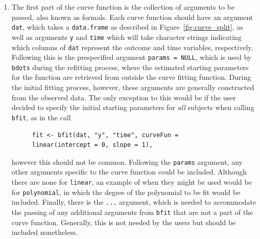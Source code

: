 \documentclass{article}
\newcommand{\xt}{\texttt}%
\begin{document}
\begin{enumerate}
\item The first part of the curve function is the collection of arguments to be passed, also known as formals. Each curve function should have an argument \xt{dat}, which takes a \xt{data.frame} as described in Figure~\ref{fig:curve_split}, as well as arguments \xt{y} and \xt{time} which will take character strings indicating which columns of \xt{dat} represent the outcome and time variables, respectively. Following this is the prespecified argument \xt{params = NULL}, which is used by \xt{bdots} during the refitting process, where the estimated starting parameters for the function are retrieved from outside the curve fitting function. During the initial fitting process, however, these arguments are generally constructed from the observed data. The only exception to this would be if the user decided to specify the initial starting parameters for \textit{all} subjects when calling \xt{bfit}, as in the call

\begin{singlespace}
\begin{figure}[H]
\centering
\begin{BVerbatim}
fit <- bfit(dat, "y", "time", curveFun = linear(intercept = 0, slope = 1),
\end{BVerbatim}
\end{figure}
\end{singlespace}
however this should not be common. Following the \xt{params} argument, any other arguments specific to the curve function could be included. Although there are none for \xt{linear}, an example of when they might be used would be for \xt{polynomial}, in which the degree of the polynomial to be fit would be included. Finally, there is the \xt{...} argument, which is needed to accommodate the passing of any additional arguments from \xt{bfit} that are not a part of the curve function. Generally, this is not needed by the users but should be included nonetheless. 


\end{enumerate}
\end{document}

